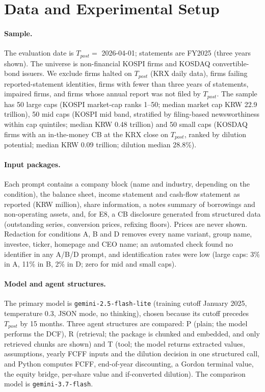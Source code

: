 \documentclass[11pt]{article}
\begin{document}
\section{Data and Experimental Setup}

\paragraph{Sample.} The evaluation date is $T_{post}=$ 2026-04-01; statements are FY2025 (three years shown). The universe is non-financial KOSPI firms and KOSDAQ convertible-bond issuers. We exclude firms halted on $T_{post}$ (KRX daily data), firms failing reported-statement identities, firms with fewer than three years of statements, impaired firms, and firms whose annual report was not filed by $T_{post}$. The sample has 50 large caps (KOSPI market-cap ranks 1--50; median market cap KRW 22.9 trillion), 50 mid caps (KOSPI mid band, stratified by filing-based newsworthiness within cap quintiles; median KRW 0.48 trillion) and 50 small caps (KOSDAQ firms with an in-the-money CB at the KRX close on $T_{post}$, ranked by dilution potential; median KRW 0.09 trillion; dilution median 28.8\%).

\paragraph{Input packages.} Each prompt contains a company block (name and industry, depending on the condition), the balance sheet, income statement and cash-flow statement as reported (KRW million), share information, a notes summary of borrowings and non-operating assets, and, for E8, a CB disclosure generated from structured data (outstanding series, conversion prices, refixing floors). Prices are never shown. Redaction for conditions A, B and D removes every name variant, group name, investee, ticker, homepage and CEO name; an automated check found no identifier in any A/B/D prompt, and identification rates were low (large caps: 3\% in A, 11\% in B, 2\% in D; zero for mid and small caps).

\paragraph{Model and agent structures.} The primary model is \texttt{gemini-2.5-flash-lite} (training cutoff January 2025, temperature 0.3, JSON mode, no thinking), chosen because its cutoff precedes $T_{post}$ by 15 months. Three agent structures are compared: P (plain; the model performs the DCF), R (retrieval; the package is chunked and embedded, and only retrieved chunks are shown) and T (tool; the model returns extracted values, assumptions, yearly FCFF inputs and the dilution decision in one structured call, and Python computes FCFF, end-of-year discounting, a Gordon terminal value, the equity bridge, per-share value and if-converted dilution). The comparison model is \texttt{gemini-3.7-flash}.
\end{document}

